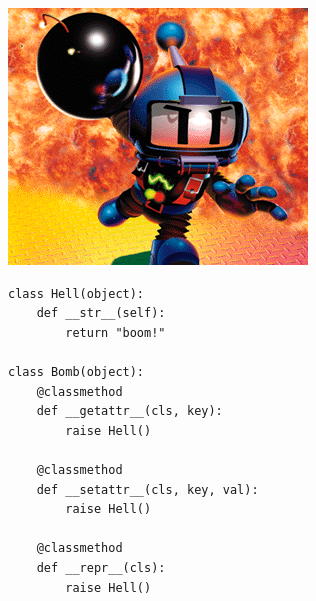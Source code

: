 \documentclass[11pt, a4paper]{article}
\begin{document}
\includegraphics[scale=0.42]{atomic.png}


\begin{lstlisting}[caption=\texttt{r2/lib/utils/utils.py}]
class Hell(object):
    def __str__(self):
        return "boom!"

class Bomb(object):
    @classmethod
    def __getattr__(cls, key):
        raise Hell()

    @classmethod
    def __setattr__(cls, key, val):
        raise Hell()

    @classmethod
    def __repr__(cls):
        raise Hell()
\end{lstlisting}
\end{document}
